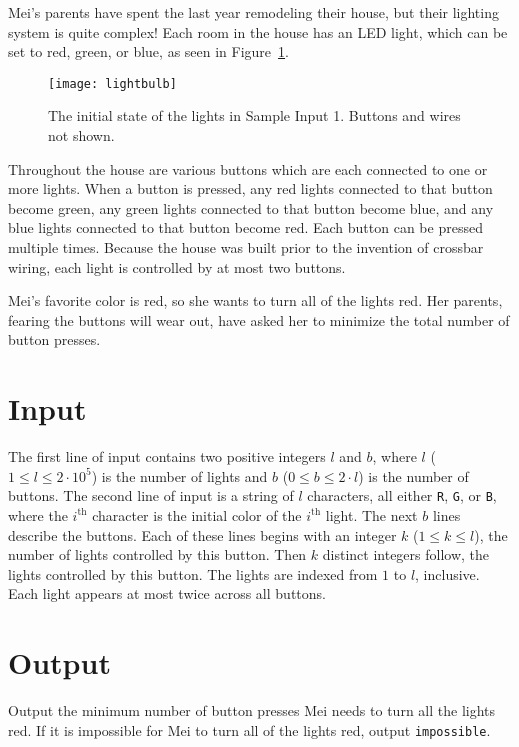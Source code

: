
Mei's parents have spent the last year remodeling their house, but their lighting system is quite complex!
Each room in the house has an LED light, which can be set to red, green, or blue, as seen in Figure~\ref{turningred:sample1}.

\begin{figure}[h]
\centering
\texttt{[image: lightbulb]}
\caption{The initial state of the lights in Sample Input 1. Buttons and wires not shown.}
\label{turningred:sample1}
\end{figure}

Throughout the house are various buttons which are each connected to one or more lights.
When a button is pressed, any red lights connected to that button become green, any green lights connected to that button become blue, and any blue lights connected to that button become red. Each button can be pressed multiple times. Because the house was built prior to the invention of crossbar wiring, each light is controlled by at most two buttons.

Mei's favorite color is red, so she wants to turn all of the lights red.
Her parents, fearing the buttons will wear out, have asked her to minimize the total number of button presses.

\section*{Input}

The first line of input contains two positive integers $l$ and $b$, where
$l$ ($1 \leq l \leq 2 \cdot 10^5$) is the number of lights and
$b$ ($0 \leq b \leq 2 \cdot l$) is the number of buttons.
The second line of input is a string of $l$ characters, all either \texttt{R}, \texttt{G}, or \texttt{B}, where the $i^{\text{th}}$ character is the initial color of the $i^{\text{th}}$ light.
The next $b$ lines describe the buttons.
Each of these lines begins with an integer $k$ ($1 \le k \le l$), the number of lights controlled by this button.
Then $k$ distinct integers follow, the lights controlled by this button.
The lights are indexed from $1$ to $l$, inclusive.
Each light appears at most twice across all buttons.

\section*{Output}

Output the minimum number of button presses Mei needs to turn all the lights red.
If it is impossible for Mei to turn all of the lights red, output \texttt{impossible}.
